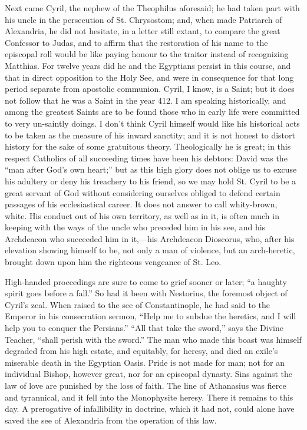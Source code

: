 Next came Cyril, the nephew of the Theophilus aforesaid; he had
taken part with his uncle in the persecution of St. Chrysostom; and,
when made Patriarch of Alexandria, he did not hesitate, in a letter
still extant, to compare the great Confessor to Judas, and to affirm
that the restoration of his name to the episcopal roll would be like
paying honour to the traitor instead of recognizing Matthias. For
twelve years did he and the Egyptians persist in this course, and that
in direct opposition to the Holy See, and were in consequence for that
long period separate from apostolic communion. Cyril, I know, is a
Saint; but it does not follow that he was a Saint in the year 412. I
am speaking historically, and among the greatest Saints are to be
found those who in early life were committed to very un-saintly
doings. I don't think Cyril himself would like his historical acts
to be taken as the measure of his inward sanctity; and it is not
honest to distort history for the sake of some gratuitous theory.
Theologically he is great; in this respect Catholics of all succeeding
times have been his debtors: David was the ``man after God's own
heart;'' but as this high glory does not oblige us to excuse his
adultery or deny his treachery to his friend, so we may hold St. Cyril
to be a great servant of God without considering ourselves obliged to
defend certain passages of his ecclesiastical career. It does not
answer to call whity-brown, white. His conduct out of his own
territory, as well as in it, is often much in keeping with the ways of
the uncle who preceded him in his see, and his Archdeacon who
succeeded him in it,—his Archdeacon Dioscorus, who, after his
elevation showing himself to be, not only a man of violence, but an
arch-heretic, brought down upon him the righteous vengeance of St.
Leo.

High-handed proceedings are sure to come to grief sooner or later;
``a haughty spirit goes before a fall.'' So had it been with
Nestorius, the foremost object of Cyril's zeal. When raised to the see
of Constantinople, he had said to the Emperor in his consecration
sermon, ``Help me to subdue the heretics, and I will help you to
conquer the Persians.'' ``All that take the sword,'' says
the Divine Teacher, ``shall perish with the sword.'' The man
who made this boast was himself degraded from his high estate, and
equitably, for heresy, and died an exile's miserable death in the
Egyptian Oasis. Pride is not made for man; not for an individual
Bishop, however great, nor for an episcopal dynasty. Sins against the
law of love are punished by the loss of faith. The line of Athanasius
was fierce and tyrannical, and it fell into the Monophysite heresy.
There it remains to this day. A prerogative of infallibility in
doctrine, which it had not, could alone have saved the see of
Alexandria from the operation of this law.

